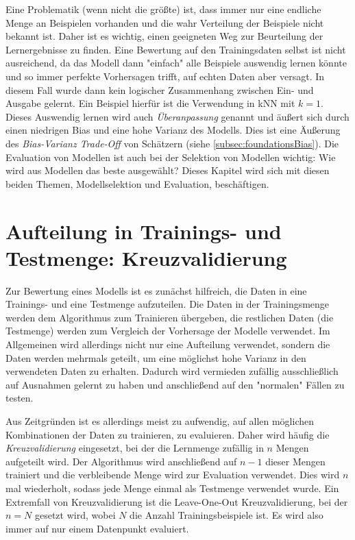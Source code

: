 	Eine Problematik (wenn nicht die größte) ist, dass immer nur eine endliche Menge an Beispielen vorhanden und die wahr Verteilung der Beispiele nicht bekannt ist. Daher ist es wichtig, einen geeigneten Weg zur Beurteilung der Lernergebnisse zu finden. Eine Bewertung auf den Trainingsdaten selbst ist nicht ausreichend, da das Modell dann "einfach" alle Beispiele auswendig lernen könnte und so immer perfekte Vorhersagen trifft, auf echten Daten aber versagt. In diesem Fall wurde dann kein logischer Zusammenhang zwischen Ein- und Ausgabe gelernt. Ein Beispiel hierfür ist die Verwendung in kNN mit \( k = 1 \). Dieses Auswendig lernen wird auch \emph{Überanpassung} genannt und äußert sich durch einen niedrigen Bias und eine hohe Varianz des Modells. Dies ist eine Äußerung des \emph{Bias-Varianz Trade-Off} von Schätzern (siehe \autoref{subsec:foundationsBias}). Die Evaluation von Modellen ist auch bei der Selektion von Modellen wichtig: Wie wird aus Modellen das beste ausgewählt? Dieses Kapitel wird sich mit diesen beiden Themen, Modellselektion und Evaluation, beschäftigen.

	\section{Aufteilung in Trainings- und Testmenge: Kreuzvalidierung}
		Zur Bewertung eines Modells ist es zunächst hilfreich, die Daten in eine Trainings- und eine Testmenge aufzuteilen. Die Daten in der Trainingsmenge werden dem Algorithmus zum Trainieren übergeben, die restlichen Daten (die Testmenge) werden zum Vergleich der Vorhersage der Modelle verwendet. Im Allgemeinen wird allerdings nicht nur eine Aufteilung verwendet, sondern die Daten werden mehrmals geteilt, um eine möglichst hohe Varianz in den verwendeten Daten zu erhalten. Dadurch wird vermieden zufällig ausschließlich auf Ausnahmen gelernt zu haben und anschließend auf den "normalen" Fällen zu testen.

		Aus Zeitgründen ist es allerdings meist zu aufwendig, auf allen möglichen Kombinationen der Daten zu trainieren, \bzw zu evaluieren. Daher wird häufig die \emph{Kreuzvalidierung} eingesetzt, bei der die Lernmenge zufällig in \(n\) Mengen aufgeteilt wird. Der Algorithmus wird anschließend auf \(n - 1\) dieser Mengen trainiert und die verbleibende Menge wird zur Evaluation verwendet. Dies wird \(n\) mal wiederholt, sodass jede Menge einmal als Testmenge verwendet wurde. Ein Extremfall von Kreuzvalidierung ist die Leave-One-Out Kreuzvalidierung, bei der \( n = N \) gesetzt wird, wobei \(N\) die Anzahl Trainingsbeispiele ist. Es wird also immer auf nur einem Datenpunkt evaluiert.

